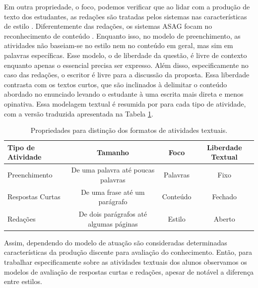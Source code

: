 Em outra propriedade, o foco, podemos verificar que ao lidar com a produção de texto dos estudantes, as redações são tratadas pelos sistemas nas características de estilo \cite{gutl2007}. Diferentemente das redações, os sistemas ASAG focam no reconhecimento de conteúdo \cite{shermis2013}. Enquanto isso, no modelo de preenchimento, as atividades não baseiam-se no estilo nem no conteúdo em geral, mas sim em palavras específicas. Esse modelo, o de liberdade da questão, é livre de contexto enquanto apenas o essencial precisa ser expresso. Além disso, especificamente no caso das redações, o escritor é livre para a discussão da proposta. Essa liberdade contrasta com os textos curtos, que são inclinados à delimitar o conteúdo abordado no enunciado levando o estudante à uma escrita mais direta e menos opinativa. Essa modelagem textual é resumida por  para cada tipo de atividade, com a versão traduzida apresentada na Tabela \ref{tab-propriedades}.

\begin{table}[h]
\centering
\begin{tabular}{l|ccc}
\hline
Tipo de Atividade & Tamanho & Foco & Liberdade Textual \\ 
\hline
Preenchimento & De uma palavra até poucas palavras  & Palavras & Fixo \\
Respostas Curtas   & De uma frase até um parágrafo  & Conteúdo & Fechado \\
Redações  & De dois parágrafos até algumas páginas & Estilo & Aberto \\
\hline
\hline
\end{tabular}
\caption{Propriedades para distinção dos formatos de atividades textuais.}
\label{tab-propriedades}
\vspace{0.5cm}
\end{table}

Assim, dependendo do modelo de atuação são consideradas determinadas características da produção discente para avaliação do conhecimento. Então, para trabalhar especificamente sobre as atividades textuais dos alunos observamos os modelos de avaliação de respostas curtas e redações, apesar de notável a diferença entre estilos.

